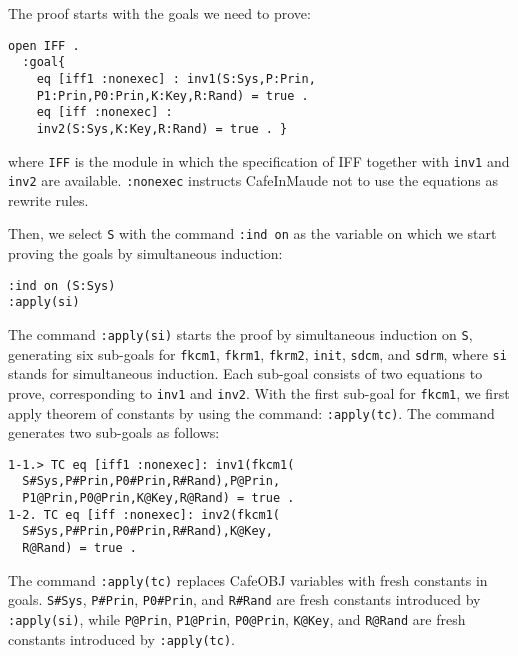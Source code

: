 \documentclass[10pt, conference, compsocconf]{IEEEtran}
\begin{document}
The proof starts with the goals we need to prove:

\begin{small}
	\begin{verbatim}
open IFF .
  :goal{
    eq [iff1 :nonexec] : inv1(S:Sys,P:Prin,
    P1:Prin,P0:Prin,K:Key,R:Rand) = true .
    eq [iff :nonexec] : 
    inv2(S:Sys,K:Key,R:Rand) = true . }
	\end{verbatim}
\end{small}  

\noindent
where \verb!IFF! is the module in which the specification of IFF together with \verb!inv1! and \verb!inv2! are available. \verb!:nonexec!  instructs CafeInMaude not to use the equations as rewrite
rules.

Then, we select \verb!S! with the command \verb!:ind on! as the
variable on which we start proving the goals by simultaneous
induction:

\begin{small}
	\begin{verbatim}
:ind on (S:Sys)
:apply(si)
	\end{verbatim}
\end{small}

The command \verb!:apply(si)! starts the proof by simultaneous
induction on \verb!S!, generating six sub-goals for \verb!fkcm1!,
\verb!fkrm1!, \verb!fkrm2!, \verb!init!, \verb!sdcm!, and \verb!sdrm!, where \verb!si! stands for simultaneous induction. Each sub-goal consists of two equations to prove, corresponding to \verb!inv1! and \verb!inv2!. 
With the first sub-goal for \verb!fkcm1!, we first apply theorem of constants by using the command: \verb!:apply(tc)!.
The command generates two sub-goals as follows:

\begin{small}
	\begin{verbatim}
1-1.> TC eq [iff1 :nonexec]: inv1(fkcm1(
  S#Sys,P#Prin,P0#Prin,R#Rand),P@Prin,
  P1@Prin,P0@Prin,K@Key,R@Rand) = true .
1-2. TC eq [iff :nonexec]: inv2(fkcm1(
  S#Sys,P#Prin,P0#Prin,R#Rand),K@Key,
  R@Rand) = true .
	\end{verbatim}
\end{small}

\noindent
The command \verb!:apply(tc)! replaces CafeOBJ
variables with fresh constants in goals. 
\verb!S#Sys!, \verb!P#Prin!, \verb!P0#Prin!, and \verb!R#Rand! are fresh constants introduced by \verb!:apply(si)!, 
while \verb!P@Prin!, \verb!P1@Prin!, \verb!P0@Prin!, \verb!K@Key!, and \verb!R@Rand! are fresh constants introduced by \verb!:apply(tc)!.
\end{document}
